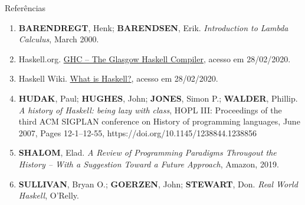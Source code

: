 \begin{frame}[fragile]{Referências}

    \begin{enumerate}
        \item \textbf{BARENDREGT}, Henk; \textbf{BARENDSEN}, Erik. \textit{Introduction to 
            Lambda Calculus}, March 2000.

        \item Haskell.org. \href{https://www.haskell.org/ghc/}{GHC -- The Glasgow Haskell 
            Compiler}, acesso em 28/02/2020.
 
        \item Haskell Wiki. \href{https://wiki.haskell.org/Introduction#What_is_Haskell.3F}
            {What is Haskell?}, acesso em 28/02/2020.

        \item \textbf{HUDAK}, Paul; \textbf{HUGHES}, John; \textbf{JONES}, Simon P.;
            \textbf{WALDER}, Phillip. \textit{A history of Haskell: being lazy with class},
               HOPL III: Proceedings of the third ACM SIGPLAN conference on History of programming languages, June 2007, Pages 12-1–12-55, https://doi.org/10.1145/1238844.1238856 

        \item \textbf{SHALOM}, Elad. \textit{A Review of Programming Paradigms Througout the 
            History -- With a Suggestion Toward a Future Approach}, Amazon, 2019.

        \item \textbf{SULLIVAN}, Bryan O.; \textbf{GOERZEN}, John; \textbf{STEWART}, Don. 
            \textit{Real World Haskell}, O'Relly.
    \end{enumerate}

\end{frame}
